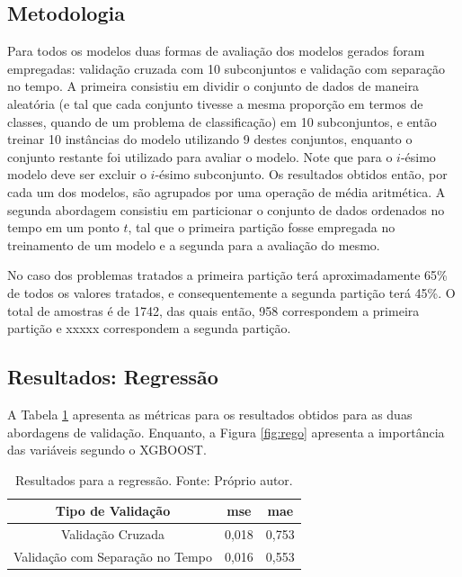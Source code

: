 \subsection{Metodologia}

Para todos os modelos duas formas de avaliação dos modelos gerados foram empregadas: validação cruzada com 10 subconjuntos e validação com separação no tempo. A primeira consistiu em dividir o conjunto de dados de maneira aleatória (e tal que cada conjunto tivesse a mesma proporção em termos de classes, quando de um problema de classificação) em 10 subconjuntos, e então treinar 10 instâncias do modelo utilizando 9 destes conjuntos, enquanto o conjunto restante foi utilizado para avaliar o modelo. Note que para o $i$-ésimo modelo deve ser excluir o $i$-ésimo subconjunto. Os resultados obtidos então, por cada um dos modelos, são agrupados por uma operação de média aritmética. A segunda abordagem consistiu em particionar o conjunto de dados ordenados no tempo em um ponto $t$, tal que o primeira partição fosse empregada no treinamento de um modelo e a segunda para a avaliação do mesmo.

No caso dos problemas tratados a primeira partição terá aproximadamente 65\% de todos os valores tratados, e consequentemente a segunda partição terá 45\%. O total de amostras é de 1742, das quais então, 958 correspondem a primeira partição e xxxxx correspondem a segunda partição.

\subsection{Resultados: Regressão}

A Tabela \ref{tab:results_reg} apresenta as métricas para os resultados obtidos para as duas abordagens de validação. Enquanto, a Figura \ref{fig:rego} apresenta a importância das variáveis segundo o XGBOOST.

\begin{table}[H]
\begin{center}
\begin{tabular}{|c|c|c|}
\hline
Tipo de Validação & mse       & mae   \\ \hline
Validação Cruzada                   & 0,018   & 0,753  \\ \hline
Validação com Separação no Tempo    & 0,016   & 0,553  \\ \hline
\end{tabular}
\end{center}
\vspace{12pt}
\caption{Resultados para a regressão. Fonte: Próprio autor.}
\label{tab:results_reg}
\end{table}

